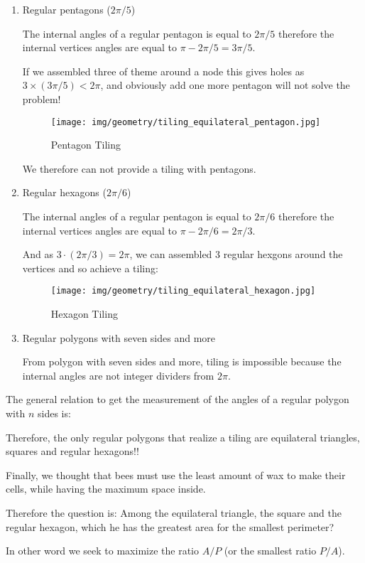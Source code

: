 {\begin{enumerate}
		\item Regular pentagons ($2\pi/5$)
		
		The internal angles of a regular pentagon is equal to $2\pi/5$ therefore the internal vertices angles are equal to $\pi-2\pi/5=3\pi/5$.
		
		If we assembled three of theme around a node this gives holes as $3\times (3\pi/5)<2\pi$, and obviously add one more pentagon will not solve the problem!
		\begin{figure}[H]
			\centering
			\texttt{[image: img/geometry/tiling\_equilateral\_pentagon.jpg]}
			\caption[]{Pentagon Tiling}
		\end{figure}
		We therefore can not provide a tiling with pentagons.
		
		\item Regular hexagons ($2\pi/6$)
		
		The internal angles of a regular pentagon is equal to $2\pi/6$ therefore the internal vertices angles are equal to $\pi-2\pi/6=2\pi/3$.
		
		And as $3\cdot (2\pi/3)=2\pi$, we can assembled 3 regular hexgons around the vertices and so achieve a tiling:
		\begin{figure}[H]
			\centering
			\texttt{[image: img/geometry/tiling\_equilateral\_hexagon.jpg]}
			\caption[]{Hexagon Tiling}
		\end{figure}
		
		\item Regular polygons with seven sides and more
		
		From polygon with seven sides and more, tiling is impossible because the internal angles are not integer dividers from $2\pi$.
	\end{enumerate}
	
	The general relation to get the measurement of the angles of a regular polygon with $n$ sides is:
	
	Therefore, the only regular polygons that realize a tiling are equilateral triangles, squares and regular hexagons!!
	
	Finally, we thought that bees must use the least amount of wax to make their cells, while having the maximum space inside.
	
	Therefore the question is: Among the equilateral triangle, the square and the regular hexagon, which he has the greatest area for the smallest perimeter?
	
	In other word we seek to maximize the ratio $A/P$ (or the smallest ratio $P/A$).
	
}
